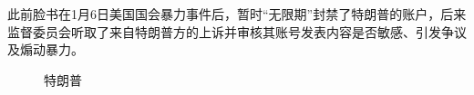 \documentclass[a4paper,11pt]{ctexart}
\begin{document}
	此前脸书在1月6日美国国会暴力事件后，暂时“无限期”封禁了特朗普的账户，后来监督委员会听取了来自特朗普方的上诉并审核其账号发表内容是否敏感、引发争议及煽动暴力。
	\begin{figure}[H]
		\centering
		\quad
		\quad
		
		\quad
		\caption{特朗普}
	\end{figure}
\end{document}
